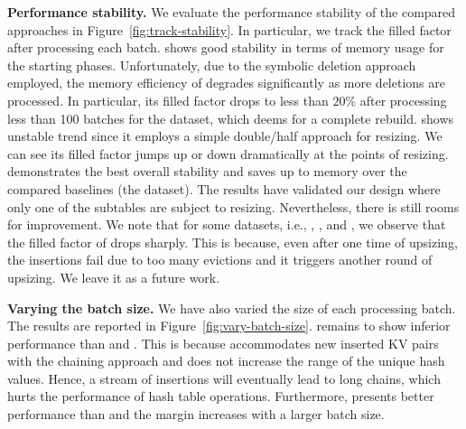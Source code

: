 

\vspace{1mm}\noindent\textbf{Performance stability.}
We evaluate the performance stability of the compared approaches in Figure~\ref{fig:track-stability}. 
In particular, we track the filled factor after processing each batch.
\slab shows good stability in terms of memory usage for the starting phases. Unfortunately, due to the symbolic deletion approach employed, the memory efficiency of \slab degrades significantly as more deletions are processed. In particular, its filled factor drops to less than $20\%$ after processing less than 100 batches for the \dsali dataset, which deems for a complete rebuild.
%
\megakv shows unstable trend since it employs a simple double/half approach for resizing. We can see its filled factor jumps up or down dramatically at the points of resizing. \voter demonstrates the best overall stability and saves up to  memory over the compared baselines (the \dsali dataset). 
The results have validated our design where only one of the subtables are subject to resizing. 
Nevertheless, there is still rooms for improvement. We note that for some datasets, i.e., \dstwitter, \dsreddit, \dstpch and \dsrandom, we observe that the filled factor of \voter drops sharply.
This is because, even after one time of upsizing, the insertions fail due to too many evictions and it triggers another round of upsizing. We leave it as a future work. 


\vspace{1mm}\noindent\textbf{Varying the batch size.}
We have also varied the size of each processing batch. The results are reported in Figure~\ref{fig:vary-batch-size}. 
\slab remains to show inferior performance than \megakv and \voter. 
This is because \slab accommodates new inserted KV pairs with the chaining approach and does not increase the range of the unique hash values. Hence, a stream of insertions will eventually lead to long chains, which hurts the performance of hash table operations. Furthermore, \voter presents better performance than \megakv and the margin increases with a larger batch size.



